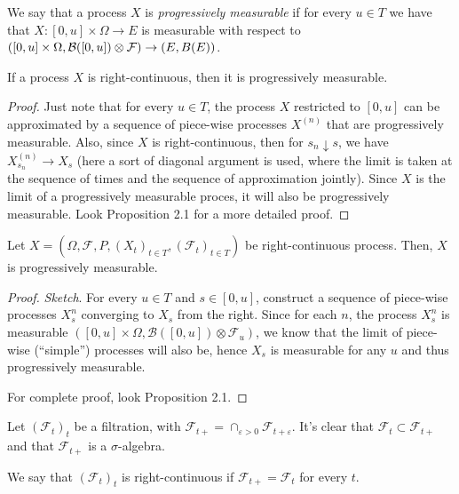 \begin{definition}
	We say that a process $X$ is \textit{progressively measurable} if
	for every $u \in T$ we have that $X:[0,u] \times \Omega \to E$ is
	measurable with respect to $([0,u]\times \Omega, \mathcal B([0,u])\otimes \mathcal F)
		\to (E, \mathcal \mathcal B(E))$.
\end{definition}

\begin{theorem}
	If a process $X$ is right-continuous, then it is progressively measurable.
\end{theorem}
\begin{proof}
	Just note that for every $u \in T$, the process $X$ restricted to $[0,u]$ can be approximated
	by a sequence of piece-wise processes $X^{(n)}$ that are progressively
	measurable. Also, since $X$ is right-continuous, then for $s_n \downarrow s$,
	we have $X^{(n)}_{s_n} \to X_s$ (here a sort of diagonal argument is used,
	where the limit is taken at the sequence of times and the sequence of approximation jointly).
	Since $X$ is the limit of a progressively measurable proces,
	it will also be progressively measurable.
	Look \citet{baldi2017introduction} Proposition 2.1 for a more detailed proof.
\end{proof}

\begin{proposition}
	Let $X = (\Omega, \mathcal F, P, (X_t)_{t \in T}, (\mathcal F_t)_{t\in T})$ be right-continuous process.
	Then, $X$ is progressively measurable.
\end{proposition}

\begin{proof}
	\textit{Sketch}. For every $u \in T$ and $s \in [0,u]$, construct a sequence of piece-wise processes $X^n_s$
	converging to $X_s$ from the right. Since for each $n$, the process $X^n_s$ is measurable
	$([0,u]\times \Omega,\mathcal B([0,u])\otimes \mathcal F_u)$, we know that the limit of piece-wise (``simple'')
	processes will also be, hence $X_s$ is measurable for any $u$ and thus progressively measurable.

	For complete proof, look \citet{baldi2017introduction} Proposition 2.1.
\end{proof}

\begin{definition}
	Let $(\mathcal F_t)_t$ be a filtration, with
	$\mathcal F_{t+} = \cap_{\varepsilon >0} \mathcal F_{t+\varepsilon}$.
	It's clear that $\mathcal F_t \subset \mathcal F_{t+}$
	and that $\mathcal F_{t+}$ is a $\sigma$-algebra.

	We say that $(\mathcal F_t)_t$ is right-continuous if
	$\mathcal F_{t+} = \mathcal F_t$ for every $t$.
\end{definition}


